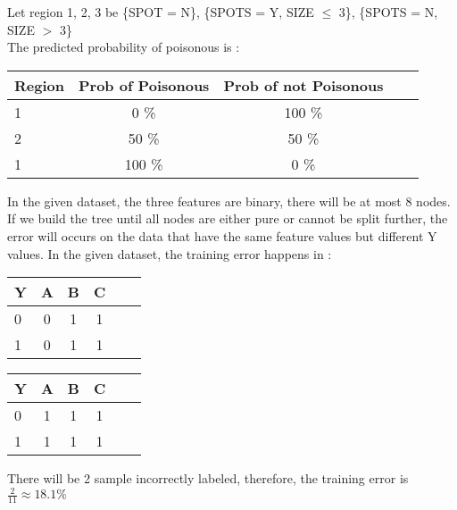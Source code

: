 \documentclass{article}
\newenvironment{problem}[2][$\bullet$]{\begin{trivlist}\large
		\item[\hskip \labelsep {\bfseries #1}\hskip \labelsep {\bfseries #2.}]}  {\end{trivlist}}
\newenvironment{sub}[2][$-$]{\begin{trivlist}
		\item[\hskip \labelsep {\bfseries #1}\hskip \labelsep {\bfseries #2.}]}  {\end{trivlist}}
\begin{document}
Let region 1, 2, 3 be \{SPOT = N\}, \{SPOTS = Y, SIZE $\leq$ 3\}, \{SPOTS = N, SIZE $>$ 3\}\\
The predicted probability of poisonous is :\\
\begin{center}
	
	\begin{tabular}{l*{3}{c}r}
		Region & Prob of Poisonous & Prob of not Poisonous \\
		\hline
		
		1 & 0 \% & 100 \% \\
		2 & 50 \% & 50 \% \\
		1 & 100 \% & 0 \% \\		
	\end{tabular}
\end{center}


\begin{sub}{6.1.3}
\end{sub}

In the given dataset, the three features are binary, there will be at most 8 nodes. If we build the tree until all nodes are either pure or cannot be split further, the error will occurs on the data that have the same feature values but different Y values. In the given dataset, the training error happens in :
\begin{center}
	
	\begin{tabular}{l*{4}{c}r}
		Y & A & B &C \\
		\hline
		0 & 0 & 1 & 1 \\
		1 & 0 & 1 & 1 \\		
	\end{tabular}   \hspace{2in}	
		\begin{tabular}{l*{4}{c}r}
			Y & A & B &C \\
			\hline
			0 & 1 & 1 & 1 \\
			1 & 1 & 1 & 1 \\		
		\end{tabular}	
\end{center}

There will be 2 sample incorrectly labeled, therefore, the training error is $\frac{2}{11} \approx 18.1 \%$

\pagebreak
\begin{problem}{6.2 Investigating Impurity Measures}
\end{problem}


\begin{sub}{6.2.1}
\end{sub}
\end{document}
